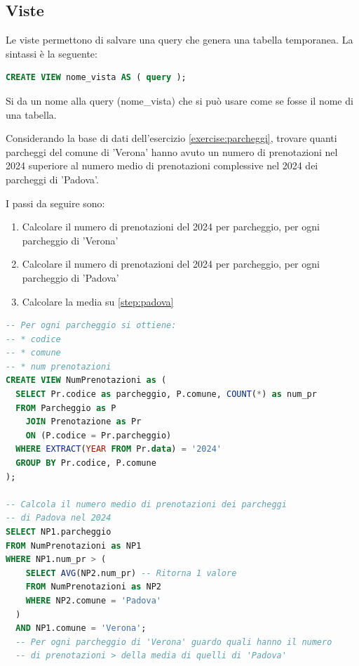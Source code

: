 \documentclass[a4paper]{article}
\begin{document}
\subsection{Viste}
Le viste permettono di salvare una query che genera una tabella temporanea.
La sintassi è la seguente:
\begin{lstlisting}[language=SQL, numbers=none]
CREATE VIEW nome_vista AS ( query );
\end{lstlisting}
Si da un nome alla query (nome\_vista) che si può usare come se fosse il nome di una
tabella.

\begin{example}
  Considerando la base di dati dell'esercizio \ref{exercise:parcheggi},
  trovare quanti parcheggi del comune di 'Verona' hanno avuto un numero di prenotazioni
  nel 2024 superiore al numero medio di prenotazioni complessive nel 2024 dei parcheggi
  di 'Padova'.

  I passi da seguire sono:
  \begin{enumerate}
    \item Calcolare il numero di prenotazioni del 2024 per parcheggio, per ogni
      parcheggio di 'Verona'

    \item \label{step:padova}
      Calcolare il numero di prenotazioni del 2024 per parcheggio, per ogni
      parcheggio di 'Padova'

    \item Calcolare la media su \ref{step:padova}
  \end{enumerate}

\begin{lstlisting}[language=SQL]
-- Per ogni parcheggio si ottiene:
-- * codice
-- * comune
-- * num prenotazioni
CREATE VIEW NumPrenotazioni as (
  SELECT Pr.codice as parcheggio, P.comune, COUNT(*) as num_pr
  FROM Parcheggio as P
    JOIN Prenotazione as Pr
    ON (P.codice = Pr.parcheggio)
  WHERE EXTRACT(YEAR FROM Pr.data) = '2024'
  GROUP BY Pr.codice, P.comune
);

-- Calcola il numero medio di prenotazioni dei parcheggi
-- di Padova nel 2024
SELECT NP1.parcheggio
FROM NumPrenotazioni as NP1
WHERE NP1.num_pr > (
    SELECT AVG(NP2.num_pr) -- Ritorna 1 valore
    FROM NumPrenotazioni as NP2
    WHERE NP2.comune = 'Padova'
  )
  AND NP1.comune = 'Verona';
  -- Per ogni parcheggio di 'Verona' guardo quali hanno il numero
  -- di prenotazioni > della media di quelli di 'Padova'
\end{lstlisting}
\end{example}
\end{document}
